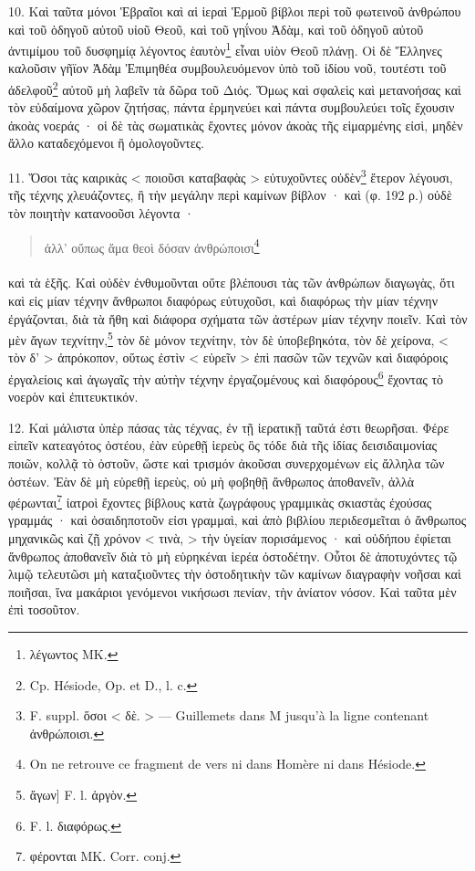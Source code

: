 \documentclass[landscape, a4paper, 11pt, oneside, polutonikogreek, french]{article}
\begin{document}
10. Καὶ ταῦτα μόνοι Ἑβραῖοι καὶ αἱ ἱεραὶ Ἑρμοῦ βίβλοι περὶ τοῦ φωτεινοῦ ἀνθρώπου καὶ τοῦ ὁδηγοῦ αὐτοῦ υἰοῦ Θεοῦ, καὶ τοῦ γηΐνου Ἀδὰμ, καὶ τοῦ ὁδηγοῦ αὐτοῦ ἀντιμίμου τοῦ δυσφημίᾳ λέγοντος ἑαυτὸν\footnote{λέγωντος MK.} εἶναι υἱὸν Θεοῦ πλάνῃ. Οἱ δὲ Ἕλληνες καλοῦσιν γῆϊον Ἀδὰμ Ἐπιμηθέα συμβουλευόμενον ὑπὸ τοῦ ἰδίου νοῦ, τουτέστι τοῦ ἀδελφοῦ\footnote{Cp. Hésiode, Op. et D., l. c.} αὐτοῦ μὴ λαβεῖν τὰ δῶρα τοῦ Διός. Ὅμως καὶ σφαλεὶς καὶ μετανοήσας καὶ τὸν εὐδαίμονα χῶρον ζητήσας, πάντα ἑρμηνεύει καὶ πάντα συμβουλεύει τοῖς ἔχουσιν ἀκοὰς νοεράς · οἱ δὲ τὰς σωματικὰς ἔχοντες μόνον ἀκοὰς τῆς εἱμαρμένης εἰσὶ, μηδὲν ἄλλο καταδεχόμενοι ἢ ὁμολογοῦντες.

11. Ὅσοι τὰς καιρικὰς < ποιοῦσι καταβαφὰς > εὐτυχοῦντες οὐδὲν\footnote{F. suppl. ὅσοι < δὲ. > --- Guillemets dans M jusqu'à la ligne contenant ἀνθρώποισι.} ἕτερον λέγουσι, τῆς τέχνης χλευάζοντες, ἢ τὴν μεγάλην περὶ καμίνων βίβλον · καὶ (φ. 192 ρ.) οὐδὲ τὸν ποιητὴν κατανοοῦσι λέγοντα ·
\begin{quotation}
ἀλλ' οὔπως ἅμα θεοὶ δόσαν ἀνθρώποισι\footnote{On ne retrouve ce fragment de vers ni dans Homère ni dans Hésiode.}
\end{quotation}
\paragraph{}
καὶ τὰ ἑξῆς. Καὶ οὐδὲν ἐνθυμοῦνται οὔτε βλέπουσι τὰς τῶν ἀνθρώπων διαγωγὰς, ὅτι καὶ εἰς μίαν τέχνην ἄνθρωποι διαφόρως εὐτυχοῦσι, καὶ διαφόρως τὴν μίαν τέχνην ἐργάζονται, διὰ τὰ ἤθη καὶ διάφορα σχήματα τῶν ἀστέρων μίαν τέχνην ποιεῖν. Καὶ τὸν μὲν ἄγων τεχνίτην,\footnote{ἄγων] F. l. ἀργὸν.} τὸν δὲ μόνον τεχνίτην, τὸν δὲ ὑποβεβηκότα, τὸν δὲ χείρονα, < τὸν δ' > ἀπρόκοπον, οὕτως ἐστὶν < εὑρεῖν > ἐπὶ πασῶν τῶν τεχνῶν καὶ διαφόροις ἐργαλείοις καὶ ἀγωγαῖς τὴν αὐτὴν τέχνην ἐργαζομένους καὶ διαφόρους\footnote{F. l. διαφόρως.} ἔχοντας τὸ νοερὸν καὶ ἐπιτευκτικόν.

12. Καὶ μάλιστα ὑπὲρ πάσας τὰς τέχνας, ἐν τῇ ἱερατικῇ ταῦτά ἐστι θεωρῆσαι. Φέρε εἰπεῖν κατεαγότος ὀστέου, ἐὰν εὑρεθῇ ἱερεὺς ὃς τόδε διὰ τῆς ἰδίας δεισιδαιμονίας ποιῶν, κολλᾷ τὸ ὀστοῦν, ὥστε καὶ τρισμόν ἀκοῦσαι συνερχομένων εἰς ἄλληλα τῶν ὀστέων. Ἐὰν δὲ μὴ εὑρεθῇ ἱερεὺς, οὐ μὴ φοβηθῇ ἄνθρωπος ἀποθανεῖν, ἀλλὰ φέρωνται\footnote{φέρονται MK. Corr. conj.} ἰατροὶ ἔχοντες βίβλους κατὰ ζωγράφους γραμμικὰς σκιαστὰς ἐχούσας γραμμάς · καὶ ὁσαιδηποτοῦν εἰσι γραμμαὶ, καὶ ἀπὸ βιβλίου περιδεσμεῖται ὁ ἄνθρωπος μηχανικῶς καὶ ζῇ χρόνον < τινὰ, > τὴν ὑγείαν πορισάμενος · καὶ οὐδήπου ἐφίεται ἄνθρωπος ἀποθανεῖν διὰ τὸ μὴ εὑρηκέναι ἱερέα ὀστοδέτην. Οὗτοι δὲ ἀποτυχόντες τῷ λιμῷ τελευτῶσι μὴ καταξιοῦντες τὴν ὀστοδητικὴν τῶν καμίνων διαγραφὴν νοῆσαι καὶ ποιῆσαι, ἵνα μακάριοι γενόμενοι νικήσωσι πενίαν, τὴν ἀνίατον νόσον. Καὶ ταῦτα μὲν ἐπὶ τοσοῦτον.
\end{document}
